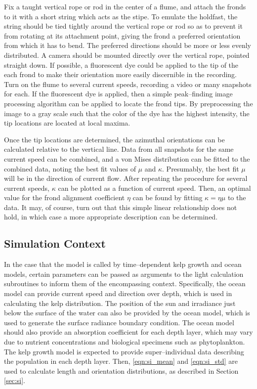 Fix a taught vertical rope or rod in the center of a flume, and attach the fronds to it with a short string which acts as the stipe.
To emulate the holdfast, the string should be tied tightly around the vertical rope or rod so as to prevent it from rotating at its attachment point,
giving the frond a preferred orientation from which it has to bend.
The preferred directions should be more or less evenly distributed.
A camera should be mounted directly over the vertical rope, pointed straight down.
If possible, a fluorescent dye could be applied to the tip of the each frond to make their orientation more easily discernible in the recording.
Turn on the flume to several current speeds, recording a video or many snapshots for each.
If the fluorescent dye is applied, then a simple peak--finding image processing algorithm can be applied to locate the frond tips.
By preprocessing the image to a gray scale such that the color of the dye has the highest intensity,
the tip locations are located at local maxima.

Once the tip locations are determined, the azimuthal orientations can be calculated relative to the vertical line.
Data from all snapshots for the same current speed can be combined, and a von Mises distribution can be fitted to the combined data,
noting the best fit values of $\mu$ and $\kappa$.
Presumably, the best fit $\mu$ will be in the direction of current flow.
After repeating the procedure for several current speeds, $\kappa$ can be plotted as a function of current speed.
Then, an optimal value for the frond alignment coefficient $\eta$ can be found by fitting $\kappa = \eta\mu$ to the data.
It may, of course, turn out that this simple linear relationship does not hold, in which case a more appropriate description can be determined.

\subsection{Simulation Context}
\label{sec:simulation_context}
In the case that the model is called by time--dependent kelp growth and ocean models, certain parameters can be passed as arguments to the light calculation subroutines to inform them of the encompassing context.
Specifically, the ocean model can provide current speed and direction over depth, which is used in calculating the kelp distribution.
The position of the sun and irradiance just below the surface of the water can also be provided by the ocean model, which is used to generate the surface radiance boundary condition.
The ocean model should also provide an absorption coefficient for each depth layer, which may vary due to nutrient concentrations and biological specimens such as phytoplankton.
The kelp growth model is expected to provide super--individual data describing the population in each depth layer.
Then, \eqref{eqn:si_mean} and \eqref{eqn:si_std} are used to calculate length and orientation distributions, as described in Section \ref{sec:si}.

